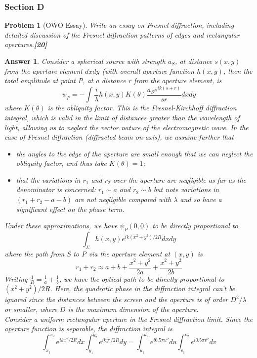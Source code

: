 \documentclass[a4paper]{article}
\newtheorem{ans}{Answer}[subsection]
\theoremstyle{new}
\newtheorem{qns}{Problem}[subsection]
\begin{document}
\subsubsection{Section D}
\begin{qns}[OWO Essay]
Write an essay on Fresnel diffraction, including detailed discussion of the Fresnel diffraction patterns of edges and rectangular apertures.\hfill\textbf{[20]}
\end{qns}
\begin{ans}
Consider a spherical source with strength $a_S$, at distance $s(x,y)$ from the aperture element $dxdy$ (with overall aperture function $h(x,y)$, then the total amplitude at point P, at a distance $r$ from the aperture element, is
$$\psi_P=-\int\frac{i}{\lambda}h(x,y)K(\theta)\frac{a_Se^{ik(s+r)}}{sr}dxdy$$
where $K(\theta)$ is the obliquity factor. This is the Fresnel-Kirchhoff diffraction integral, which is valid in the limit of distances greater than the wavelength of light, allowing us to neglect the vector nature of the electromagnetic wave. In the case of Fresnel diffraction (diffracted beam on-axis), we assume further that
\begin{itemize}
    \item the angles to the edge of the aperture are small enough that we can neglect the obliquity factor, and thus take $K(\theta)=1$;
    \item that the variations in $r_1$ and $r_2$ over the aperture are negligible as far as the denominator is concerned: $r_1\sim a$ and $r_2\sim b$ but note variations in $(r_1+r_2-a-b)$ are not negligible compared with $\lambda$ and so have a significant effect on the phase term.
\end{itemize}
Under these approximations, we have $\psi_P(0,0)$ to be directly proportional to
$$\int_\Sigma h(x,y)e^{ik(x^2+y^2)/2R}dxdy$$
where the path from S to P via the aperture element at $(x,y)$ is
$$r_1+r_2\approx a+b+\frac{x^2+y^2}{2a}+\frac{x^2+y^2}{2b}$$
Writing $\frac{1}{R}=\frac{1}{a}+\frac{1}{b}$, we have the optical path to be directly proportional to $(x^2+y^2)/2R$. Here, the quadratic phase in the diffraction integral can't be ignored since the distances between the screen and the aperture is of order $D^2/\lambda$ or smaller, where $D$ is the maximum dimension of the aperture.\\[5pt]
Consider a uniform rectangular aperture in the Fresnel diffraction limit. Since the aperture function is separable, the diffraction integral is
$$\int_{x_1}^{x_2}e^{ikx^2/2R}dx\int_{y_1}^{y_2}e^{iky^2/2R}dy=\int_{u_1}^{u_2}e^{i0.5\pi u^2}du\int_{v_1}^{v_2}e^{i0.5\pi v^2}dv$$

\end{ans}
\end{document}

